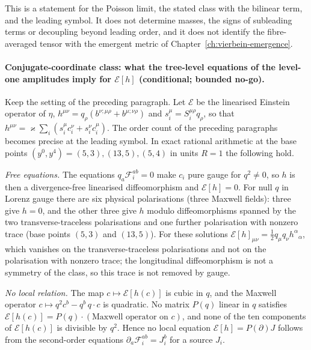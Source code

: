 This is a statement for the Poisson limit, the stated class with the bilinear term, and the leading symbol. It does not determine masses, the signs of subleading terms or decoupling beyond leading order, and it does not identify the fibre-averaged tensor with the emergent metric of Chapter~\ref{ch:vierbein-emergence}.

\paragraph{Conjugate-coordinate class: what the tree-level equations of the level-one amplitudes imply for \(\mathcal E[h]\) (conditional; bounded no-go).}
Keep the setting of the preceding paragraph. Let \(\mathcal E\) be the linearised Einstein operator of \(\eta\), \(h^{\mu\nu}=q_\rho(b^{\nu;\mu\rho}+b^{\mu;\nu\rho})\) and \(s_i^\mu=S_i^{\mu\rho}q_\rho\), so that \(h^{\mu\nu}=\varkappa\sum_i(s_i^\mu c_i^\nu+s_i^\nu c_i^\mu)\). The order count of the preceding paragraphs becomes precise at the leading symbol. In exact rational arithmetic at the base points \((y^0,y^4)=(5,3),(13,5),(5,4)\) in units \(R=1\) the following hold.

\emph{Free equations.} The equations \(q_a\mathcal F_i^{ab}=0\) make \(c_i\) pure gauge for \(q^2\neq0\), so \(h\) is then a divergence-free linearised diffeomorphism and \(\mathcal E[h]=0\). For null \(q\) in Lorenz gauge there are six physical polarisations (three Maxwell fields): three give \(h=0\), and the other three give \(h\) modulo diffeomorphisms spanned by the two transverse-traceless polarisations and one further polarisation with nonzero trace (base points \((5,3)\) and \((13,5)\)). For these solutions \(\mathcal E[h]_{\mu\nu}=\tfrac12q_\mu q_\nu h^\alpha{}_\alpha\), which vanishes on the transverse-traceless polarisations and not on the polarisation with nonzero trace; the longitudinal diffeomorphism is not a symmetry of the class, so this trace is not removed by gauge.

\emph{No local relation.} The map \(c\mapsto\mathcal E[h(c)]\) is cubic in \(q\), and the Maxwell operator \(c\mapsto q^2c^b-q^b\,q\cdot c\) is quadratic. No matrix \(P(q)\) linear in \(q\) satisfies \(\mathcal E[h(c)]=P(q)\cdot(\text{Maxwell operator on }c)\), and none of the ten components of \(\mathcal E[h(c)]\) is divisible by \(q^2\). Hence no local equation \(\mathcal E[h]=P(\partial)J\) follows from the second-order equations \(\partial_a\mathcal F_i^{ab}=J_i^b\) for a source \(J_i\).

